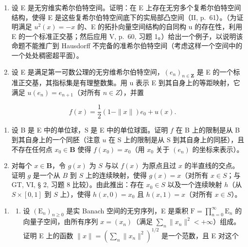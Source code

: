 \begin{enumerate}
\def\labelenumi{\arabic{enumi})}
\setcounter{enumi}{11}
\item
  设 E 是无穷维实希尔伯特空间。证明：在 E 上存在无穷多个复希尔伯特空间结构，使得 E 是这些复希尔伯特空间底下的实局部凸空间（II, p.~61）。（为证明满足 \(u^{2}(x) = -x\) 的、E 的拓扑向量空间结构的自同构 u 的存在性，利用 E 的一个标准正交基；然后应用 V, p.~60, 习题 1。）给出一个例子，以说明该命题不能推广到 Hausdorff 不完备的准希尔伯特空间（考虑这样一个空间中的一个处处稠密超平面）。
\item
  设 E 是满足第一可数公理的无穷维希尔伯特空间，\((e_{n})_{n\in\mathbf{Z}}\) 是 E 的一个标准正交基，其指标集是有理整数集。用 u 表示 E 到其自身上的等距映射，它满足 \(u(e_{n}) = e_{n+1}\)（对所有 \(n \in Z\)），并置
\end{enumerate}

\[
f (x) = \frac {1}{2} (1 - \| x \|) e _ {0} + u (x).
\]

\begin{enumerate}
\def\labelenumi{\alph{enumi})}
\item
  设 B 是 E 中的单位球，S 是 E 中的单位球面。证明 \(f\) 在 B 上的限制是从 B 到其自身上的一个同胚（注意 \(u\) 在 S 上的限制是从 S 到其自身上的同胚），且不存在任何点 \(x_0 \in \mathbf{B}\) 使得 \(f(x_0) = x_0\)（用 \(x_0\) 关于 \((e_n)\) 的坐标来表示）。
\item
  对每个 \(x \in \mathbf{B}\)，令 \(g(x)\) 为 \(S\) 与以 \(f(x)\) 为原点且过 \(x\) 的半直线的交点。证明 \(g\) 是一个从 \(B\) 到 \(S\) 上的连续映射，使得 \(g(x) = x\)（对所有 \(x \in S\)；与 GT, VI, § 2, 习题 8 比较）。由此推出：存在 \(x_0 \in S\) 以及一个连续映射 \(h\)（从 \(S \times [0,1]\) 到 \(S\) 上），使得 \(h(x,0) = x_0\) 且 \(h(x,1) = x\)（对所有 \(x \in S\)）。
\end{enumerate}

\begin{enumerate}
\def\labelenumi{\arabic{enumi})}
\setcounter{enumi}{13}
\tightlist
\item
  \begin{enumerate}
  \def\labelenumii{\alph{enumii})}
  \tightlist
  \item
    设 \((\mathrm{E}_n)_{n\geqslant 0}\) 是实 Banach 空间的无穷序列，E 是乘积 \(\mathrm{F} = \prod_{n = 0}^{\infty}\mathrm{E}_n\) 的向量子空间，由所有序列 \(x = (x_{n})\)（满足 \(\sum_{n}\| x_{n}\|^{2} < + \infty\)）组成。证明 E 上的函数 \(\| x\| = (\sum_{n}\| x_{n}\|^{2})^{1 / 2}\) 是一个范数，且 E 对这个
  \end{enumerate}
\end{enumerate}

